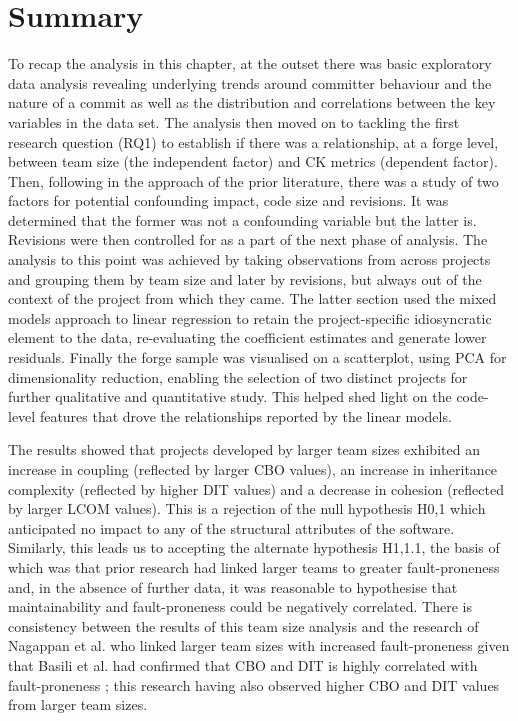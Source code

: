 \section{Summary} %
To recap the analysis in this chapter, at the outset there was basic exploratory data analysis revealing underlying trends around committer behaviour and the nature of a commit as well as the distribution and correlations between the key variables in the data set. The analysis then moved on to tackling the first research question (RQ1) to establish if there was a relationship, at a forge level, between team size (the independent factor) and CK metrics (dependent factor). Then, following in the approach of the prior literature, there was a study of two factors for potential confounding impact, code size and revisions. It was determined that the former was not a confounding variable but the latter is. Revisions were then controlled for as a part of the next phase of analysis. The analysis to this point was achieved by taking observations from across projects and grouping them by team size and later by revisions, but always out of the context of the project from which they came. The latter section used the mixed models approach to linear regression to retain the project-specific idiosyncratic element to the data, re-evaluating the coefficient estimates and generate lower residuals. Finally the forge sample was visualised on a scatterplot, using PCA for dimensionality reduction, enabling the selection of two distinct projects for further qualitative and quantitative study. This helped shed light on the code-level features that drove the relationships reported by the linear models.

The results showed that projects developed by larger team sizes exhibited an increase in coupling (reflected by larger CBO values), an increase in inheritance complexity (reflected by higher DIT values) and a decrease in cohesion (reflected by larger LCOM values). This is a rejection of the null hypothesis H0,1 which anticipated no impact to any of the structural attributes of the software. Similarly, this leads us to accepting the alternate hypothesis H1,1.1, the basis of which was that prior research had linked larger teams to greater fault-proneness and, in the absence of further data, it was reasonable to hypothesise that maintainability and fault-proneness could be negatively correlated. There is consistency between the results of this team size analysis and the research of Nagappan et al. \citep{nagappan2008influence} who linked larger team sizes with increased fault-proneness given that Basili et al. had confirmed that CBO and DIT is highly correlated with fault-proneness \citep{basili1996validation}; this research having also observed higher CBO and DIT values from larger team sizes.

